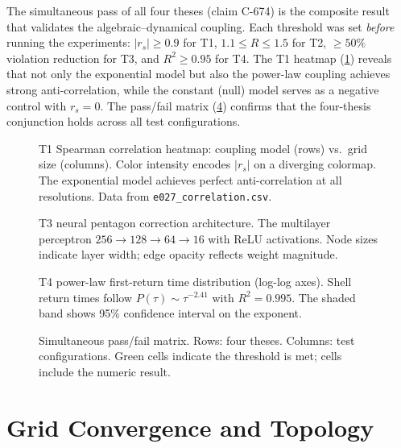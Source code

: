 \documentclass[12pt,openany]{report}
\theoremstyle{definition}
\theoremstyle{plain}
\theoremstyle{remark}
\begin{document}
The simultaneous pass of all four theses (claim C-674) is the composite
result that validates the algebraic--dynamical coupling.  Each threshold
was set \emph{before} running the experiments: $|r_s| \geq 0.9$ for T1,
$1.1 \leq R \leq 1.5$ for T2, $\geq 50\%$ violation reduction for T3,
and $R^2 \geq 0.95$ for T4.  The T1 heatmap (\cref{fig:t1-heatmap})
reveals that not only the exponential model but also the power-law
coupling achieves strong anti-correlation, while the constant (null)
model serves as a negative control with $r_s = 0$.  The pass/fail matrix
(\cref{fig:passfail}) confirms that the four-thesis conjunction holds
across all test configurations.

\begin{figure}[htbp]
\centering

\caption{T1 Spearman correlation heatmap: coupling model (rows) vs.\
grid size (columns).  Color intensity encodes $|r_s|$ on a
diverging colormap.  The exponential model achieves perfect
anti-correlation at all resolutions.  Data from
\texttt{e027\_correlation.csv}.}
\label{fig:t1-heatmap}
\end{figure}

\begin{figure}[htbp]
\centering

\caption{T3 neural pentagon correction architecture.  The multilayer
perceptron $256 \to 128 \to 64 \to 16$ with ReLU activations.
Node sizes indicate layer width; edge opacity reflects weight magnitude.}
\label{fig:neural-net}
\end{figure}

\begin{figure}[htbp]
\centering

\caption{T4 power-law first-return time distribution (log-log axes).  Shell return
times follow $P(\tau) \sim \tau^{-2.41}$ with $R^2 = 0.995$.  The
shaded band shows 95\% confidence interval on the exponent.}
\label{fig:t4-loglog}
\end{figure}

\begin{figure}[htbp]
\centering

\caption{Simultaneous pass/fail matrix.  Rows: four theses.
Columns: test configurations.  Green cells indicate the
threshold is met; cells include the numeric result.}
\label{fig:passfail}
\end{figure}


\chapter{Grid Convergence and Topology}
\label{ch:convergence}
\end{document}
